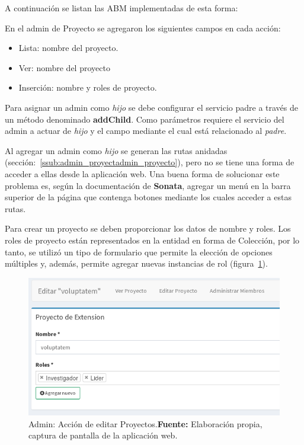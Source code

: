 A continuación se listan las ABM implementadas de esta forma:

\begin{itemize}
        
\end{itemize}



En el admin de Proyecto se agregaron los siguientes campos en cada acción:

\begin{itemize}
    \item Lista: nombre del proyecto.
    \item Ver: nombre del proyecto
    \item Inserción: nombre y roles de proyecto.
\end{itemize}

Para asignar un admin como \textit{hijo} se debe configurar el servicio padre a través de un método denominado \textbf{addChild}. Como parámetros requiere el servicio
del admin a actuar de \textit{hijo} y el campo mediante el cual está relacionado al \textit{padre}.


Al agregar un admin como \textit{hijo} se generan las rutas anidadas (sección:~\ref{ssub:admin_proyectadmin_proyecto}), pero no se tiene una forma de acceder a
ellas desde la aplicación web\@. Una buena forma de solucionar este problema es, según la documentación de \textbf{Sonata}, agregar un menú en la barra superior
de la página que contenga botones mediante los cuales acceder a estas rutas.\parencite{sonata-childAdmin}


Para crear un proyecto se deben proporcionar los datos de nombre y roles. Los roles de proyecto están representados en la entidad en forma de Colección,
por lo tanto, se utilizó un tipo de formulario que permite la elección de opciones múltiples y, además, permite agregar nuevas instancias de
rol (figura~\ref{fig:image/proyecto-editar}).

\begin{figure}[h]
    \includegraphics[width=1\linewidth]{image/edit-proyecto.png}
    \caption{Admin: Acción de  editar Proyectos.\newline \textbf{Fuente:} Elaboración propia, captura de pantalla de la aplicación web.}
    \label{fig:image/proyecto-editar}
\end{figure}
\newpage
{}%

